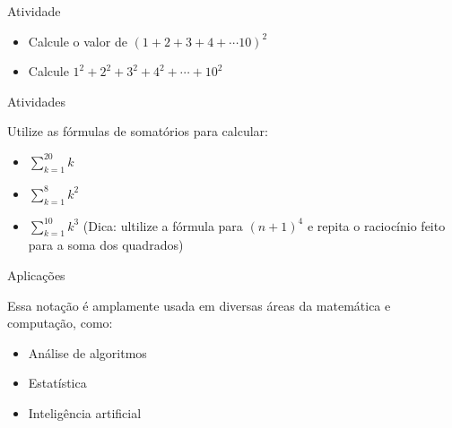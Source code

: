 \documentclass{beamer} %
\begin{document}
\begin{frame}{Atividade}

\begin{itemize}
\item Calcule o valor de $\displaystyle (1+2+3+4+\cdots 10)^2$

\item Calcule $\displaystyle 1^2+2^2+3^2+4^2+\cdots + 10^2$ 
\end{itemize}
    
\end{frame}

\begin{frame}{Atividades}

Utilize as fórmulas de somatórios para calcular:

\begin{itemize}
		\item \( \displaystyle  \sum_{k=1}^{20} k \) 
		\item \( \displaystyle  \sum_{k=1}^{8} k^2 \) 
		\item \( \displaystyle  \sum_{k=1}^{10} k^3 \) (Dica: ultilize a fórmula para $(n+1)^4$ e repita o raciocínio feito para a soma dos quadrados)
\end{itemize}

\end{frame}
        


\begin{frame}{Aplicações}
    
    
    Essa notação é amplamente usada em diversas áreas da matemática e computação, como:
    \begin{itemize}
        \item Análise de algoritmos
        \item Estatística
        \item Inteligência artificial
    \end{itemize}
\end{frame}
\end{document}
